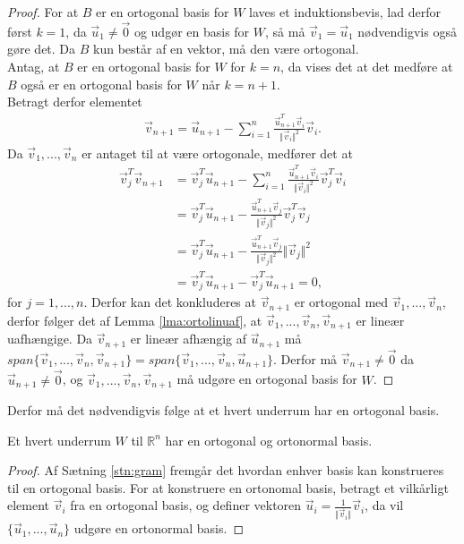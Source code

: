 \begin{proof}
For at $B$ er en ortogonal basis for $W$ laves et induktionsbevis, lad derfor først $k= 1$, da $\vec{u}_1\neq \vec{0}$ og udgør en basis for $W$, så må $\vec{v}_1 = \vec{u}_1$ nødvendigvis også gøre det.
Da $B$ kun består af en vektor, må den være ortogonal.
\\Antag, at $B$ er en ortogonal basis for $W$ for $k=n$, da vises det at det medføre at $B$ også er en ortogonal basis for  $W$ når $k = n+1$.
\\Betragt derfor elementet 
\begin{align*}
\vec{v}_{n+1} = \vec{u}_{n+1} - \sum_{i=1}^n \frac{\vec{u}_{n+1}^T\vec{v}_i}{\Vert\vec{v}_i\Vert^2}\vec{v}_i.
\end{align*}
Da $\vec{v}_1,...,\vec{v}_n$ er antaget til at være ortogonale, medfører det at
\begin{align*}
\vec{v}_j^T\vec{v}_{n+1} &= \vec{v}_j^T\vec{u}_{n+1} - \sum_{i=1}^n \frac{\vec{u}_{n+1}^T\vec{v}_i}{\Vert\vec{v}_i\Vert^2}\vec{v}_j^T\vec{v}_i
\\ &= \vec{v}_j^T\vec{u}_{n+1} - \frac{\vec{u}_{n+1}^T\vec{v}_j}{\Vert\vec{v}_j\Vert^2}\vec{v}_j^T\vec{v}_j
\\ & = \vec{v}_j^T\vec{u}_{n+1} -  \frac{\vec{u}_{n+1}^T\vec{v}_j}{\Vert\vec{v}_j\Vert^2}\Vert\vec{v}_j\Vert^2
\\ & =\vec{v}_j^T\vec{u}_{n+1} - \vec{v}_j^T\vec{u}_{n+1} = 0 , 
\end{align*}
for $j = 1,...,n$. 
Derfor kan det konkluderes at $\vec{v}_{n+1}$ er ortogonal med $\vec{v}_1,...,\vec{v}_n$, derfor følger det af Lemma \ref{lma:ortolinuaf}, at $\vec{v}_1,...,\vec{v}_n, \vec{v}_{n+1}$ er lineær uafhængige.
Da $\vec{v}_{n+1}$ er lineær afhængig af $\vec{u}_{n+1}$ må $span\{\vec{v}_1,...,\vec{v}_n, \vec{v}_{n+1}\} = span\{\vec{v}_1,...,\vec{v}_n, \vec{u}_{n+1}\}$.
Derfor må $\vec{v}_{n+1} \neq \vec{0}$ da $\vec{u}_{n+1} \neq \vec{0}$, og $\vec{v}_1,...,\vec{v}_n, \vec{v}_{n+1}$ må udgøre en ortogonal basis for $W$.
\end{proof}
Derfor må det nødvendigvis følge at et hvert underrum har en ortogonal basis.
\begin{kor}
Et hvert underrum $W$ til $\mathds{R}^n$ har en ortogonal og ortonormal basis.
\end{kor}
\begin{proof}
Af Sætning \ref{stn:gram} fremgår det hvordan enhver basis kan konstrueres til en ortogonal basis. 
For at konstruere en ortonomal basis, betragt et vilkårligt element $\vec{v}_i$ fra en ortogonal basis, og definer vektoren $\vec{u}_i = \frac{1}{\Vert\vec{v}_i\Vert}\vec{v}_i$, da vil $\{\vec{u}_1,...,\vec{u}_n\}$ udgøre en ortonormal basis. 
\end{proof}
